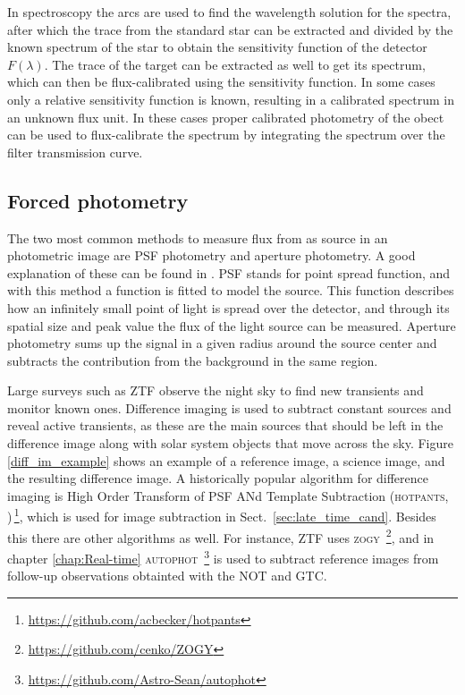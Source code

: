 \documentclass[a4paper,oneside,12pt, class=Latex/Classes/PhDthesisPSnPDF, crop=false]{standalone}
\begin{document}
In spectroscopy the arcs are used to find the wavelength solution for the spectra, after which the trace from the standard star can be extracted and divided by the known spectrum of the star to obtain the sensitivity function of the detector $F(\lambda)$. The trace of the target can be extracted as well to get its spectrum, which can then be flux-calibrated using the sensitivity function. In some cases only a relative sensitivity function is known, resulting in a calibrated spectrum in an unknown flux unit. In these cases proper calibrated photometry of the obect can be used to flux-calibrate the spectrum by integrating the spectrum over the filter transmission curve.


\subsection{Forced photometry}
The two most common methods to measure flux from as source in an photometric image are PSF photometry and aperture photometry. A good explanation of these can be found in \citet{Photometry_techniques}. PSF stands for point spread function, and with this method a function is fitted to model the source. This function describes how an infinitely small point of light is spread over the detector, and through its spatial size and peak value the flux of the light source can be measured. Aperture photometry sums up the signal in a given radius around the source center and subtracts the contribution from the background in the same region.


Large surveys such as ZTF observe the night sky to find new transients and monitor known ones. Difference imaging is used to subtract constant sources and reveal active transients, as these are the main sources that should be left in the difference image along with solar system objects that move across the sky. Figure \ref{diff_im_example} shows an example of a reference image, a science image, and the resulting difference image. A historically popular algorithm for difference imaging is High Order Transform of PSF ANd Template Subtraction (\textsc{hotpants}, \citealt{HOTPANTS})\,\footnote{\url{https://github.com/acbecker/hotpants}}, which is used for image subtraction in Sect.~\ref{sec:late_time_cand}. Besides this there are other algorithms as well. For instance, ZTF uses \textsc{zogy} \citep{ZOGY}\,\footnote{\url{https://github.com/cenko/ZOGY}}, and in chapter \ref{chap:Real-time} \textsc{autophot} \citep{Autophot}\,\footnote{\url{https://github.com/Astro-Sean/autophot}} is used to subtract reference images from follow-up observations obtainted with the NOT and GTC.
\end{document}
